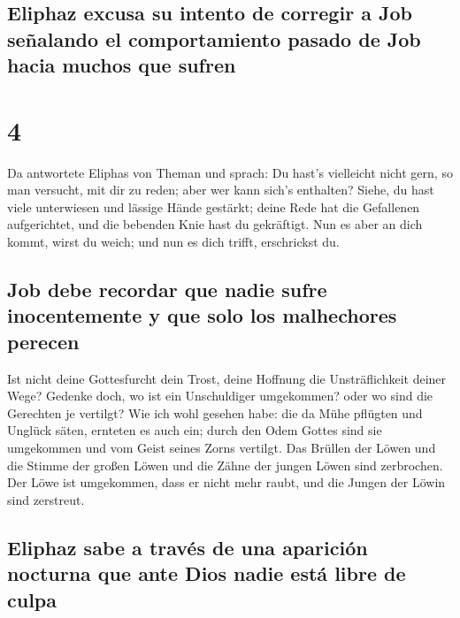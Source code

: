 \hypertarget{eliphaz-excusa-su-intento-de-corregir-a-job-seuxf1alando-el-comportamiento-pasado-de-job-hacia-muchos-que-sufren}{%
\subsection{Eliphaz excusa su intento de corregir a Job señalando el
comportamiento pasado de Job hacia muchos que
sufren}\label{eliphaz-excusa-su-intento-de-corregir-a-job-seuxf1alando-el-comportamiento-pasado-de-job-hacia-muchos-que-sufren}}

\hypertarget{section-3}{%
\section{4}\label{section-3}}

 Da antwortete Eliphas von Theman und sprach:
 Du hast's vielleicht nicht gern, so man versucht, mit dir
zu reden; aber wer kann sich's enthalten?  Siehe, du hast
viele unterwiesen und lässige Hände gestärkt;  deine Rede
hat die Gefallenen aufgerichtet, und die bebenden Knie hast du
gekräftigt.  Nun es aber an dich kommt, wirst du weich;
und nun es dich trifft, erschrickst du.

\hypertarget{job-debe-recordar-que-nadie-sufre-inocentemente-y-que-solo-los-malhechores-perecen}{%
\subsection{Job debe recordar que nadie sufre inocentemente y que solo
los malhechores
perecen}\label{job-debe-recordar-que-nadie-sufre-inocentemente-y-que-solo-los-malhechores-perecen}}

 Ist nicht deine Gottesfurcht dein Trost, deine Hoffnung
die Unsträflichkeit deiner Wege?  Gedenke doch, wo ist ein
Unschuldiger umgekommen? oder wo sind die Gerechten je vertilgt?
 Wie ich wohl gesehen habe: die da Mühe pflügten und
Unglück säten, ernteten es auch ein;  durch den Odem
Gottes sind sie umgekommen und vom Geist seines Zorns vertilgt.
 Das Brüllen der Löwen und die Stimme der großen Löwen
und die Zähne der jungen Löwen sind zerbrochen.  Der Löwe
ist umgekommen, dass er nicht mehr raubt, und die Jungen der Löwin sind
zerstreut.

\hypertarget{eliphaz-sabe-a-travuxe9s-de-una-apariciuxf3n-nocturna-que-ante-dios-nadie-estuxe1-libre-de-culpa}{%
\subsection{Eliphaz sabe a través de una aparición nocturna que ante
Dios nadie está libre de
culpa}\label{eliphaz-sabe-a-travuxe9s-de-una-apariciuxf3n-nocturna-que-ante-dios-nadie-estuxe1-libre-de-culpa}}

